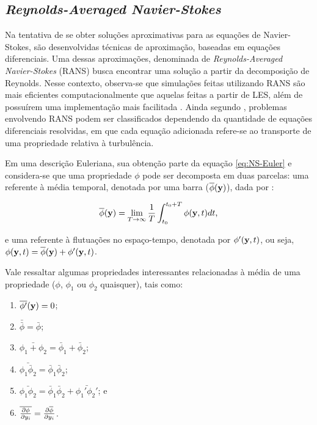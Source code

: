 \documentclass[_ArquivoPrincipal.tex]{subfiles}
\begin{document}
\subsection{\textit{Reynolds-Averaged Navier-Stokes}} \label{RANS}

Na tentativa de se obter soluções aproximativas para as equações de Navier-Stokes, são desenvolvidas técnicas de aproximação, baseadas em equações diferenciais. Uma dessas aproximações, denominada de \textit{Reynolds-Averaged Navier-Stokes} (RANS) busca encontrar uma solução a partir da decomposição de Reynolds. Nesse contexto, observa-se que simulações feitas utilizando RANS são mais eficientes computacionalmente que aquelas feitas a partir de LES, além de possuírem uma implementação mais facilitada \cite{alfonsi2009reynolds, ling2015evaluation}. Ainda segundo , problemas envolvendo RANS podem ser classificados dependendo da quantidade de equações diferenciais resolvidas, em que cada equação adicionada refere-se ao transporte de uma propriedade relativa à turbulência.

Em uma descrição Euleriana, sua obtenção parte da equação \ref{eq:NS-Euler} e considera-se que uma propriedade $\phi$ pode ser decomposta em duas parcelas: uma referente à média temporal, denotada por uma barra ($\overline{\phi}(\mathbf{y})$), dada por \cite{tennekes1972first,speziale1991analytical}:

\begin{equation}
    \overline{\phi}(\mathbf{y})=\lim_{T\to\infty}{\frac{1}{T}\int_{t_0}^{t_0+T}{\phi(\mathbf{y},t)dt}}\text{,}
\end{equation}

\noindent e uma referente à flutuações no espaço-tempo, denotada por $\phi'(\mathbf{y},t)$, ou seja, $\phi(\mathbf{y},t)=\overline{\phi}(\mathbf{y})+\phi'(\mathbf{y},t)$.

Vale ressaltar algumas propriedades interessantes relacionadas à média de uma propriedade ($\phi$, $\phi_1$ ou $\phi_2$ quaisquer), tais como:

\begin{enumerate}[label=\alph*.]
    \item $\overline{\phi'}(\mathbf{y})=0$;
    \item $\bar{\bar{\phi}}=\bar{\phi}$;
    \item $\bar{\phi_1+\phi_2}=\bar{\phi}_1+\bar{\phi}_2$;
    \item $\bar{\phi_1\bar{\phi}_2}=\bar{\phi}_1\bar{\phi}_2$;
    \item $\bar{\phi_1\phi_2}=\bar{\phi}_1\bar{\phi}_2+\bar{\phi_1'\phi_2'}$; e
    \item $\overline{\frac{\partial{\phi}}{\partial{y_i}}}=\frac{\partial{\overline{\phi}}}{\partial{y_i}}$.
\end{enumerate}
\end{document}
